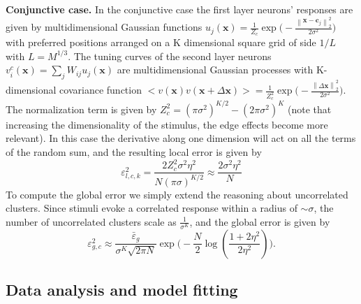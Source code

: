 \documentclass[a4paper]{article}
\begin{document}
\newline
\newline
\textbf{Conjunctive case.} In the conjunctive case the first layer neurons' responses are given by multidimensional Gaussian functions $u_j(\mathbf{x}) =\frac{1}{Z_c} \exp{\Big(-\frac{\left\lVert \mathbf{x}-\mathbf{c}_j\right\rVert_2^2}{2\sigma^2}\Big)}$   with preferred positions arranged on a K dimensional square grid of side $1/L$ with $L = M^{1/3}$. 
The tuning curves of the second layer neurons $v^c_i(\mathbf{x}) = \sum_j W_{ij} u_j(\mathbf{x})$ are multidimensional Gaussian processes with K-dimensional covariance function $<v(\mathbf{x})v(\mathbf{x} + \Delta \mathbf{x}) > = \frac{1}{Z_c^2} \exp{\Big(-\frac{\left\lVert\Delta\mathbf{x}\right\rVert_2^2}{2\sigma^2}\Big)}$.
The normalization term is given by $Z_c^2 = (\pi\sigma^2)^{K/2} - (2\pi \sigma^2)^K$ (note that increasing the dimensionality of the stimulus, the edge effects become more relevant).
In this case the derivative along one dimension will act on all the terms of the random sum, and the resulting local error is given by
\begin{equation}
\varepsilon_{l,c,k}^2 = \frac{2Z_c^2 \sigma^2 \eta^2}{N(\pi \sigma)^{K/2}} \approx \frac{2\sigma^2 \eta^2}{N}
\end{equation}
To compute the global error we simply extend the reasoning about uncorrelated clusters. Since stimuli evoke a correlated response within a radius of $\sim \sigma$, the number of uncorrelated clusters scale as $\frac{1}{\sigma^K}$, and the global error is given by
\begin{equation}
\varepsilon_{g,c}^2 \approx \frac{\bar{\varepsilon}_g}{\sigma^K\sqrt{2\pi N}} \exp{\Big(-\frac{N}{2} \log(\frac{1+2\eta^2}{2\eta^2})\Big)}.
\end{equation}

\subsection{Data analysis and model fitting}
\end{document}
